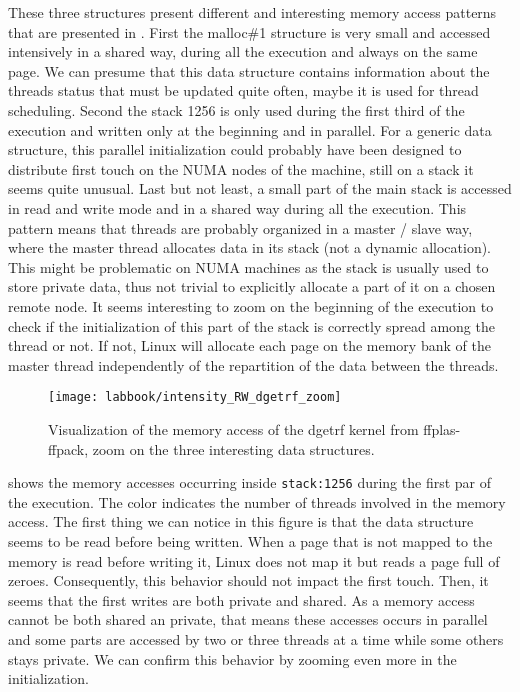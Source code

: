 These three structures present different and interesting memory access patterns that are presented in .
First the malloc\#1 structure is very small and accessed intensively in a shared way, during all the execution and always on the same page.
We can presume that this data structure contains information about the threads status that must be updated quite often, maybe it is used for thread scheduling.
Second the stack 1256 is only used during the first third of the execution and written only at the beginning and in parallel.
For a generic data structure, this parallel initialization could probably have been designed to distribute first touch on the \gls{NUMA} nodes of the machine, still on a stack it seems quite unusual.
Last but not least, a small part of the main stack is accessed in read and write mode and in a shared way during all the execution.
This pattern means that threads are probably organized in a master / slave way, where the master thread allocates data in its stack (not a dynamic allocation).
This might be problematic on \gls{NUMA} machines as the stack is usually used to store private data, thus not trivial to explicitly allocate a part of it on a chosen remote node.
It seems interesting to zoom on the beginning of the execution to check if the initialization of this part of the stack is correctly spread among the thread or not.
If not, Linux will allocate each page on the memory bank of the master thread independently of the repartition of the data between the threads.

\begin{figure}[htb]
    \centering
    \texttt{[image: labbook/intensity\_RW\_dgetrf\_zoom]}
    \caption{Visualization of the memory access of the dgetrf kernel from ffplas-ffpack, zoom on the three interesting data structures.}
    \label{fig:dgetrf-share-zoom}
\end{figure}

 shows the memory accesses occurring inside \texttt{stack:1256} during the first par of the execution.
The color indicates the number of threads involved in the memory access.
The first thing we can notice in this figure is that the data structure seems to be read before being written.
When a page that is not mapped to the memory is read before writing it, \gls{Linux} does not map it but reads a page full of zeroes.
Consequently, this behavior should not impact the first touch.
Then, it seems that the first writes are both private and shared.
As a memory access cannot be both shared an private, that means these accesses occurs in parallel and some parts are accessed by two or three threads at a time while some others stays private.
We can confirm this behavior by zooming even more in the initialization.

